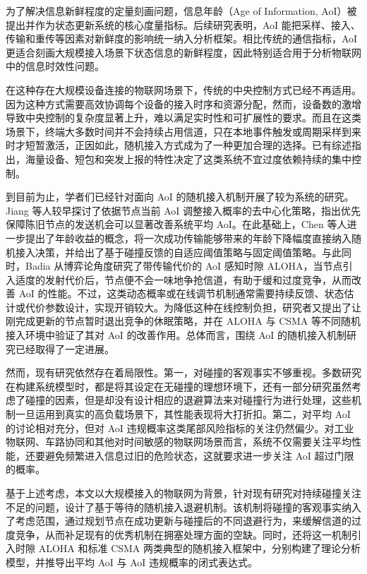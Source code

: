 为了解决信息新鲜程度的定量刻画问题，信息年龄（Age of Information, AoI）被提出并作为状态更新系统的核心度量指标。后续研究表明，AoI 能把采样、接入、传输和重传等因素对新鲜度的影响统一纳入分析框架。相比传统的通信指标，AoI 更适合刻画大规模接入场景下状态信息的新鲜程度，因此特别适合用于分析物联网中的信息时效性问题。

在这种存在大规模设备连接的物联网场景下，传统的中央控制方式已经不再适用。因为这种方式需要高效协调每个设备的接入时序和资源分配，然而，设备数的激增导致中央控制的复杂度显著上升，难以满足实时性和可扩展性的要求。而且在这类场景下，终端大多数时间并不会持续占用信道，只在本地事件触发或周期采样到来时才短暂激活，正因如此，随机接入方式成为了一种更加合理的选择。已有综述指出，海量设备、短包和突发上报的特性决定了这类系统不宜过度依赖持续的集中控制。

到目前为止，学者们已经针对面向 AoI 的随机接入机制开展了较为系统的研究。Jiang 等人较早探讨了依据节点当前 AoI 调整接入概率的去中心化策略，指出优先保障陈旧节点的发送机会可以显著改善系统平均 AoI。在此基础上，Chen 等人进一步提出了年龄收益的概念，将一次成功传输能够带来的年龄下降幅度直接纳入随机接入决策，并给出了基于碰撞反馈的自适应阈值策略与固定阈值策略。与此同时，Badia 从博弈论角度研究了带传输代价的 AoI 感知时隙 ALOHA，当节点引入适度的发射代价后，节点便不会一味地争抢信道，有助于缓和过度竞争，从而改善 AoI 的性能。不过，这类动态概率或在线调节机制通常需要持续反馈、状态估计或代价参数设计，实现开销较大。为降低这种在线控制负担，研究者又提出了让刚完成更新的节点暂时退出竞争的休眠策略，并在 ALOHA 与 CSMA 等不同随机接入环境中验证了其对 AoI 的改善作用。总体而言，围绕 AoI 的随机接入机制研究已经取得了一定进展。

然而，现有研究依然存在着局限性。第一，对碰撞的客观事实不够重视。多数研究在构建系统模型时，都是将其设定在无碰撞的理想环境下，还有一部分研究虽然考虑了碰撞的因素，但是却没有设计相应的退避算法来对碰撞行为进行处理，这些机制一旦运用到真实的高负载场景下，其性能表现将大打折扣。第二，对平均 AoI 的讨论相对充分，但对 AoI 违规概率这类尾部风险指标的关注仍然偏少。对工业物联网、车路协同和其他对时间敏感的物联网场景而言，系统不仅需要关注平均性能，还要避免频繁进入信息过旧的危险状态，这就要求进一步关注 AoI 超过门限的概率。

基于上述考虑，本文以大规模接入的物联网为背景，针对现有研究对持续碰撞关注不足的问题，设计了基于等待的随机接入退避机制。该机制将碰撞的客观事实纳入了考虑范围，通过规划节点在成功更新与碰撞后的不同退避行为，来缓解信道的过度竞争，从而补足现有的优秀机制在拥塞处理方面的空缺。同时，还将这一机制引入时隙 ALOHA 和标准 CSMA 两类典型的随机接入框架中，分别构建了理论分析模型，并推导出平均 AoI 与 AoI 违规概率的闭式表达式。

